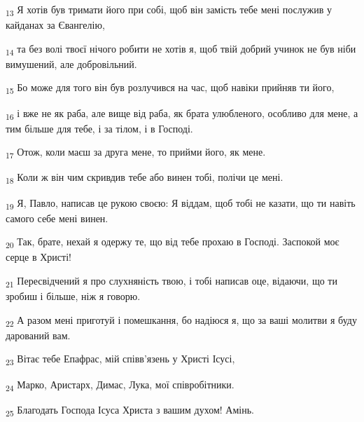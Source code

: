 \begin{tcolorbox}
\textsubscript{13} Я хотів був тримати його при собі, щоб він замість тебе мені послужив у кайданах за Євангелію,
\end{tcolorbox}
\begin{tcolorbox}
\textsubscript{14} та без волі твоєї нічого робити не хотів я, щоб твій добрий учинок не був ніби вимушений, але добровільний.
\end{tcolorbox}
\begin{tcolorbox}
\textsubscript{15} Бо може для того він був розлучився на час, щоб навіки прийняв ти його,
\end{tcolorbox}
\begin{tcolorbox}
\textsubscript{16} і вже не як раба, але вище від раба, як брата улюбленого, особливо для мене, а тим більше для тебе, і за тілом, і в Господі.
\end{tcolorbox}
\begin{tcolorbox}
\textsubscript{17} Отож, коли маєш за друга мене, то прийми його, як мене.
\end{tcolorbox}
\begin{tcolorbox}
\textsubscript{18} Коли ж він чим скривдив тебе або винен тобі, полічи це мені.
\end{tcolorbox}
\begin{tcolorbox}
\textsubscript{19} Я, Павло, написав це рукою своєю: Я віддам, щоб тобі не казати, що ти навіть самого себе мені винен.
\end{tcolorbox}
\begin{tcolorbox}
\textsubscript{20} Так, брате, нехай я одержу те, що від тебе прохаю в Господі. Заспокой моє серце в Христі!
\end{tcolorbox}
\begin{tcolorbox}
\textsubscript{21} Пересвідчений я про слухняність твою, і тобі написав оце, відаючи, що ти зробиш і більше, ніж я говорю.
\end{tcolorbox}
\begin{tcolorbox}
\textsubscript{22} А разом мені приготуй і помешкання, бо надіюся я, що за ваші молитви я буду дарований вам.
\end{tcolorbox}
\begin{tcolorbox}
\textsubscript{23} Вітає тебе Епафрас, мій співв'язень у Христі Ісусі,
\end{tcolorbox}
\begin{tcolorbox}
\textsubscript{24} Марко, Аристарх, Димас, Лука, мої співробітники.
\end{tcolorbox}
\begin{tcolorbox}
\textsubscript{25} Благодать Господа Ісуса Христа з вашим духом! Амінь.
\end{tcolorbox}
